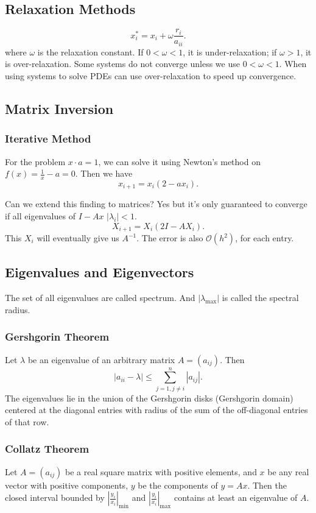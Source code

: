\documentclass[class=article, crop=false]{standalone}
\theoremstyle{plain}
\theoremstyle{remark}
\begin{document}
\subsection{Relaxation Methods}

\[
	x_i^* = x_i + \omega \frac{r_i}{a_{ii}}
.\] 
where $\omega$ is the relaxation constant. If $0<\omega<1$, it is under-relaxation; if $\omega>1$, it is over-relaxation.
Some systems do not converge unless we use $0<\omega<1$.
When using systems to solve PDEs can use over-relaxation to speed up convergence.


\subsection{Matrix Inversion}

\subsubsection{Iterative Method}

For the problem $x \cdot a = 1$, we can solve it using Newton's method on $f(x)=\frac{1}{x}-a=0$. Then we have 
\[
	x_{i+1}=x_i(2-ax_i)
.\] 

Can we extend this finding to matrices?
Yes but it's only guaranteed to converge if all eigenvalues of $I-Ax$ $ |\lambda_i| <1 $.
\[
	X_{i+1}=X_i(2I-AX_i)
.\]
This $X_i$ will eventually give us $A^{-1}$. The error is also $\mathcal{O}(h^2)$, for each entry.

\subsection{Eigenvalues and Eigenvectors}
The set of all eigenvalues are called spectrum. And $|\lambda_{\max}|$ is called the spectral radius.

\subsubsection{Gershgorin Theorem}
Let $\lambda$ be an eigenvalue of an arbitrary matrix $A = (a_{ij}) $. Then
\[
	|a_{ii}-\lambda|\leq \sum_{j=1,j\neq i}^n |a_{ij} |
.\] 
The eigenvalues lie in the union of the Gershgorin disks (Gershgorin domain) centered at the diagonal entries with radius of the sum of the off-diagonal entries of that row.

\subsubsection{Collatz Theorem}
Let $A=(a_{ij}) $ be a real square matrix with positive elements, and $x$ be any real vector with positive components, $y$ be the components of $y=Ax$. Then the closed interval bounded by $\left| \frac{y_i}{x_i} \right|_{\min} $ and $\left| \frac{y_i}{x_i} \right|_{\max} $ contains at least an eigenvalue of $A$.
\end{document}
